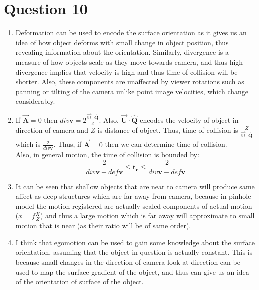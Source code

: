 \documentclass{article}
\newcommand{\boldvec}[1]{\boldsymbol{\vec{\textbf{#1}}}}
\newcommand{\capvec}[1]{\boldsymbol{\hat{\textbf{#1}}}}
\begin{document}
\section*{Question 10}
\begin{enumerate}[label=(\alph*)]

\item Deformation can be used to encode the surface orientation as it gives us an idea of how object deforms
with small change in object position, thus revealing information about the orientation. Similarly, divergence
is a measure of how objects scale as they move towards camera, and thus high divergence implies that velocity
is high and thus time of collision will be shorter. Also, these components are unaffected by viewer rotations
such as panning or tilting of the camera unlike point image velocities, which change considerably.

\item If $\boldvec{A}=0$ then $div\mathbf{v} = 2\frac{\boldvec{U}\cdot\capvec{Q}}{Z}$. Also,
$\boldvec{U}\cdot\capvec{Q}$ encodes the velocity of object in direction of camera and $Z$ is distance of
object. Thus, time of collision is $\frac{Z}{\boldvec{U}\cdot\capvec{Q}}$ which is $\frac{2}{div\mathbf{v}}$.
Thus, if $\boldvec{A}=0$ then we can determine time of collision.\\
Also, in general motion, the time of collision is bounded by:
$$
\frac{2}{div\mathbf{v} + def\mathbf{v}} \leq \mathbf{t_c} \leq \frac{2}{div\mathbf{v} - def\mathbf{v}}
$$

\item It can be seen that shallow objects that are near to camera will produce same affect as deep structures
which are far away from camera, because in pinhole model the motion registered are actually scaled components of
actual motion ($x = f\frac{X}{Z}$) and thus a large motion which is far away will approximate to small motion that
is near (as their ratio will be of same order).

\item I think that egomotion can be used to gain some knowledge about the surface orientation, assuming that
the object in question is actually constant. This is because small changes in the direction of camera look-at direction
can be used to map the surface gradient of the object, and thus can give us an idea of the orientation of surface of the object.

\end{enumerate}
\end{document}
